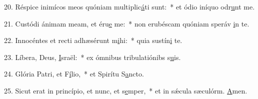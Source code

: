 20. Réspice inimícos meos quóniam multiplic\uline{á}ti sunt:~* et ódio iníquo odr\uline{u}nt me.\par 
21. Custódi ánimam meam, et éru\uline{e} me:~* non erubéscam quóniam speráv \uline{i}n te.\par 
22. Innocéntes et recti adhæsérunt m\uline{i}hi:~* quia sustín\uline{i} te.\par 
23. Líbera, Deus, \uline{I}sraël:~* ex ómnibus tribulatiónibs s\uline{u}is.\par 
24. Glória Patri, et F\uline{í}lio,~* et Spirítu S\uline{a}ncto.\par 
25. Sicut erat in princípio, et nunc, et s\uline{e}mper,~* et in sǽcula sæculórm. \uline{A}men.\par 

